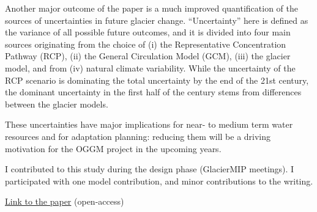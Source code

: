 Another major outcome of the paper is a much improved quantification of the sources of uncertainties
in future glacier change. “Uncertainty” here is defined as the variance of all possible future outcomes, and it is
divided into four main sources originating from the choice of (i) the Representative Concentration Pathway (RCP),
(ii) the General Circulation Model (GCM), (iii) the glacier model, and from (iv) natural climate variability.
While the uncertainty of the RCP scenario is dominating the total uncertainty by the end of the 21st century,
the dominant uncertainty in the first half of the century stems from differences between the glacier models.

These uncertainties have major implications for near- to medium term water resources and for adaptation planning:
reducing them will be a driving motivation for the OGGM project in the upcoming years.

I contributed to this study during the design phase (GlacierMIP meetings). I participated with one model contribution,
and minor contributions to the writing.

\href{https://doi.org/10.1029/2019ef001470}{Link to the paper} (open-access)

%

